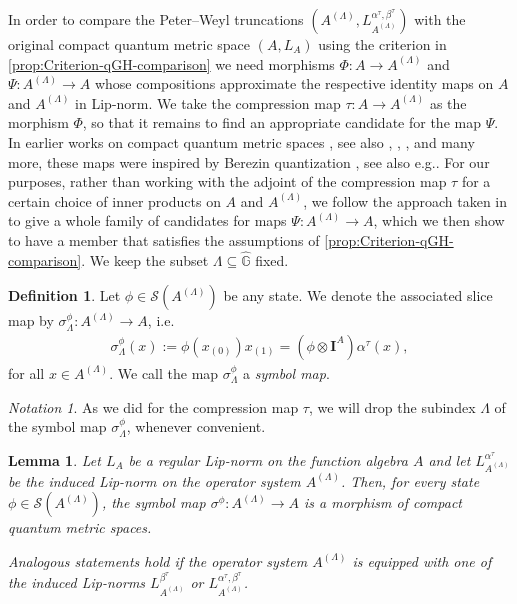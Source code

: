 \documentclass{amsart}
\theoremstyle{plain}
\newtheorem{lemma}[theorem]{Lemma}
\theoremstyle{definition}
\newtheorem{definition}[theorem]{Definition}
\theoremstyle{remark}
\newtheorem{notation}[theorem]{Notation}
\begin{document}
	In order to compare the Peter--Weyl truncations $(A^{(\Lambda)},	L_{A^{(\Lambda)}}^{\alpha^\tau,\beta^\tau})$ with the original compact quantum metric space $(A,L_A)$ using the criterion in \autoref{prop:Criterion-qGH-comparison} we need morphisms $\Phi : A \rightarrow A^{(\Lambda)}$ and $\Psi : A^{(\Lambda)} \rightarrow A$ whose compositions approximate the respective identity maps on $A$ and $A^{(\Lambda)}$ in Lip-norm.
	We take the compression map $\tau : A \rightarrow A^{(\Lambda)}$ as the morphism $\Phi$, so that it remains to find an appropriate candidate for the map $\Psi$.
	In earlier works on compact quantum metric spaces \cite{Rie04}, see also \cite{Sai09}, \cite{KK22}, \cite{vS21}, \cite{LvS24} and many more, these maps were inspired by Berezin quantization \cite{Ber75}, see also e.g.\@ \cite{Lan99}.
	For our purposes, rather than working with the adjoint of the compression map $\tau$ for a certain choice of inner products on $A$ and $A^{(\Lambda)}$, we follow the approach taken in \cite{GEvS23} to give a whole family of candidates for maps $\Psi : A^{(\Lambda)} \rightarrow A$, which we then show to have a member that satisfies the assumptions of \autoref{prop:Criterion-qGH-comparison}.
	We keep the subset $\Lambda \subseteq \widehat{\mathbb{G}}$ fixed.
	
	\begin{definition}\label{def:Symbol-map}
		Let $\phi \in \mathcal{S}(A^{(\Lambda)})$ be any state.
		We denote the associated slice map by $\sigma_\Lambda^\phi : A^{(\Lambda)} \rightarrow A$, i.e.\@
		\begin{align}
			\sigma_\Lambda^\phi(x) := \phi(x_{(0)})x_{(1)} 
			= (\phi \otimes \mathbf{I}^A) \alpha^{\tau}(x),
		\end{align}
		for all $x \in A^{(\Lambda)}$.
		We call the map $\sigma_\Lambda^\phi$ a \emph{symbol map}.
	\end{definition}
	
	\begin{notation}
		As we did for the compression map $\tau$, we will drop the subindex $\Lambda$ of the symbol map $\sigma_\Lambda^\phi$, whenever convenient.
	\end{notation}
	
	\begin{lemma}\label{lem:Symbol-map-morphism}
		Let $L_A$ be a regular Lip-norm on the function algebra $A$ and let $L_{A^{(\Lambda)}}^{\alpha^\tau}$ be the induced Lip-norm on the operator system $A^{(\Lambda)}$.
		Then, for every state $\phi \in \mathcal{S}(A^{(\Lambda)})$, the symbol map $\sigma^\phi : A^{(\Lambda)} \rightarrow A$ is a morphism of compact quantum metric spaces.
		
		Analogous statements hold if the operator system $A^{(\Lambda)}$ is equipped with one of the induced Lip-norms $L_{A^{(\Lambda)}}^{\beta^\tau}$ or $L_{A^{(\Lambda)}}^{\alpha^\tau,\beta^\tau}$.
	\end{lemma}
	
\end{document}
